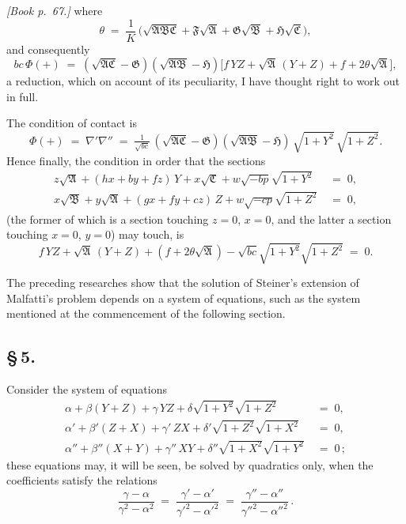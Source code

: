 \documentclass[11pt]{article}
\providecommand{\fA}{\mathfrak{A}}
\providecommand{\fB}{\mathfrak{B}}
\providecommand{\fC}{\mathfrak{C}}
\providecommand{\fF}{\mathfrak{F}}
\providecommand{\fG}{\mathfrak{G}}
\providecommand{\fH}{\mathfrak{H}}
\begin{document}
\bigskip

\noindent\emph{[Book p.~67.]} where
\[
\theta \;=\; \frac{1}{K}\,\bigl(\sqrt{\fA\fB\fC} + \fF\sqrt{\fA} + \fG\sqrt{\fB} + \fH\sqrt{\fC}\bigr),
\]
and consequently
\[
bc\,\Phi(+) \;=\; (\sqrt{\fA\fC} - \fG)(\sqrt{\fA\fB} - \fH)\bigl[f\,YZ + \sqrt{\fA}\,(Y + Z) + f + 2\theta\sqrt{\fA}\bigr],
\]
a reduction, which on account of its peculiarity, I have thought right to work out in full.

The condition of contact is
\[
\Phi(+) \;=\; \nabla'\nabla'' \;=\; \tfrac{1}{\sqrt{bc}}\,(\sqrt{\fA\fC} - \fG)(\sqrt{\fA\fB} - \fH)\,\sqrt{1 + Y^{2}}\,\sqrt{1 + Z^{2}}.
\]
Hence finally, the condition in order that the sections
\begin{align*}
z\sqrt{\fA} + (hx + by + fz)\,Y + x\sqrt{\fC} + w\sqrt{-bp}\sqrt{1 + Y^{2}} &\;=\; 0,\\
x\sqrt{\fB} + y\sqrt{\fA} + (gx + fy + cz)\,Z + w\sqrt{-cp}\sqrt{1 + Z^{2}} &\;=\; 0,
\end{align*}
(the former of which is a section touching $z = 0$, $x = 0$, and the latter a section touching $x = 0$, $y = 0$) may touch, is
\[
f\,YZ + \sqrt{\fA}\,(Y + Z) + (f + 2\theta\sqrt{\fA}) - \sqrt{bc}\sqrt{1 + Y^{2}}\sqrt{1 + Z^{2}} \;=\; 0.
\]

The preceding researches show that the solution of Steiner's extension of Malfatti's problem depends on a system of equations, such as the system mentioned at the commencement of the following section.

\bigskip

\subsection*{\S\,5.}

Consider the system of equations
\begin{align*}
\alpha + \beta(Y + Z) + \gamma\,YZ + \delta\sqrt{1 + Y^{2}}\sqrt{1 + Z^{2}} &\;=\; 0,\\
\alpha' + \beta'(Z + X) + \gamma'\,ZX + \delta'\sqrt{1 + Z^{2}}\sqrt{1 + X^{2}} &\;=\; 0,\\
\alpha'' + \beta''(X + Y) + \gamma''\,XY + \delta''\sqrt{1 + X^{2}}\sqrt{1 + Y^{2}} &\;=\; 0\,;
\end{align*}
these equations may, it will be seen, be solved by quadratics only, when the coefficients satisfy the relations
\[
\frac{\gamma - \alpha}{\gamma^{2} - \alpha^{2}} \;=\; \frac{\gamma' - \alpha'}{\gamma'^{2} - \alpha'^{2}} \;=\; \frac{\gamma'' - \alpha''}{\gamma''^{2} - \alpha''^{2}}\,.
\]
\end{document}

